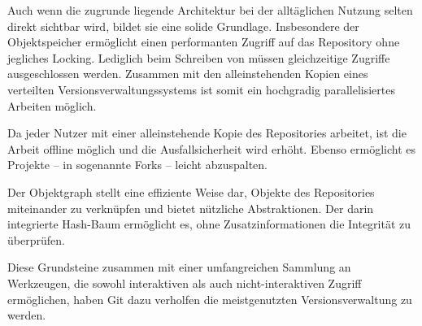 \documentclass[
	nonacm,%
	screen,%
	sigplan,
]{acmart}
\begin{document}
Auch wenn die zugrunde liegende Architektur bei der alltäglichen Nutzung selten direkt sichtbar wird, bildet sie eine solide Grundlage. Insbesondere der Objektspeicher ermöglicht einen performanten Zugriff auf das Repository ohne jegliches Locking. Lediglich beim Schreiben von  müssen gleichzeitige Zugriffe ausgeschlossen werden. Zusammen mit den alleinstehenden Kopien eines verteilten Versionsverwaltungssystems ist somit ein hochgradig parallelisiertes Arbeiten möglich.

Da jeder Nutzer mit einer alleinstehende Kopie des Repositories arbeitet, ist die Arbeit offline möglich und die Ausfallsicherheit wird erhöht. Ebenso ermöglicht es Projekte -- in sogenannte Forks -- leicht abzuspalten.

Der Objektgraph stellt eine effiziente Weise dar, Objekte des Repositories miteinander zu verknüpfen und bietet nützliche Abstraktionen. Der darin integrierte Hash-Baum ermöglicht es, ohne Zusatzinformationen die Integrität zu überprüfen.

Diese Grundsteine zusammen mit einer umfangreichen Sammlung an Werkzeugen, die sowohl interaktiven als auch nicht-interaktiven Zugriff ermöglichen, haben Git dazu verholfen die meistgenutzten Versionsverwaltung zu werden. \cite{git-popularity}



\end{document}
